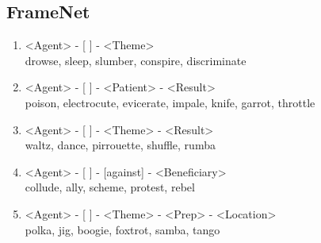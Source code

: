 \documentclass[11pt,a4paper,twocolumn]{article}
\begin{document}
	\subsection{FrameNet}
		\begin{enumerate}
			\item <Agent> - [ ] - <Theme>\\
			drowse, sleep, slumber, conspire, discriminate
		
			\item <Agent> - [ ] - <Patient> - <Result>\\
			poison, electrocute, evicerate, impale, knife, garrot, throttle		
			
			\item <Agent> - [ ] - <Theme> - <Result>\\
			waltz, dance, pirrouette, shuffle, rumba	
			
			\item <Agent> - [ ] - [against] - <Beneficiary>\\
			collude, ally, scheme, protest, rebel
			
			\item <Agent> - [ ] - <Theme> - <Prep> - <Location>\\
			polka, jig, boogie, foxtrot, samba, tango
			
		\end{enumerate}
	
	
\end{document}
